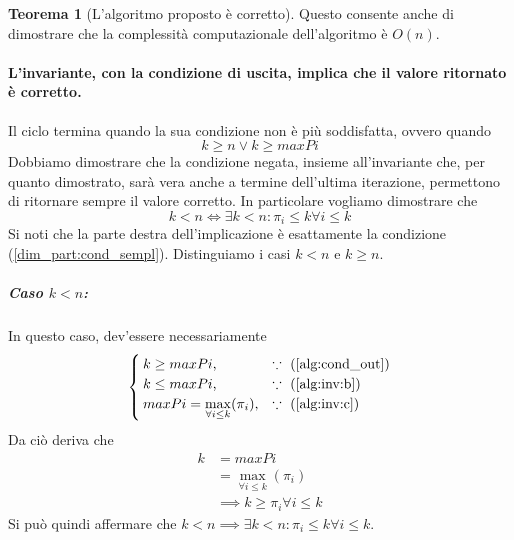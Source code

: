 \documentclass{article}
\theoremstyle{definition}
\newtheorem{theorem}{Teorema}
\begin{document}
\begin{theorem}[L'algoritmo proposto è corretto]
    Questo consente anche di dimostrare che la complessità computazionale dell'algoritmo è $O(n)$.

    \paragraph{L'invariante, con la condizione di uscita, implica che il valore ritornato è corretto.}
    Il ciclo termina quando la sua condizione non è più soddisfatta, ovvero quando
    \begin{equation}\label{alg:cond_out}
        k \geq n \vee k \geq maxPi
    \end{equation}
    Dobbiamo dimostrare che la condizione negata, insieme all'invariante che, per quanto dimostrato, sarà vera anche a termine dell'ultima iterazione, permettono di ritornare sempre il valore corretto.
    In particolare vogliamo dimostrare che
    \[ k < n \iff \exists k < n : \pi_i \leq k \forall i \leq k \]
    Si noti che la parte destra dell'implicazione è esattamente la condizione (\ref{dim_part:cond_sempl}).
    Distinguiamo i casi $k < n$ e $k \geq n$.

    \subparagraph{Caso $k < n$:}
    In questo caso, dev'essere necessariamente
    \begin{equation*}
        \begin{cases}
            k \geq maxPi \mbox{,}                                        & \because \mbox{ (\ref{alg:cond_out})} \\
            k \leq maxPi \mbox{,}                                        & \because \mbox{ (\ref{alg:inv:b})}    \\
            maxPi = \displaystyle\max_{\forall i \leq k}(\pi_i) \mbox{,} & \because \mbox{ (\ref{alg:inv:c})}
        \end{cases}
    \end{equation*}
    Da ciò deriva che
    \begin{align*}
        k & = maxPi                                \\
          & = \max_{\forall i \leq k}(\pi_i)       \\
          & \implies k \geq \pi_i \forall i \leq k
    \end{align*}
    Si può quindi affermare che $k < n \implies \exists k < n : \pi_i \leq k \forall i \leq k$.


\end{theorem}
\end{document}
